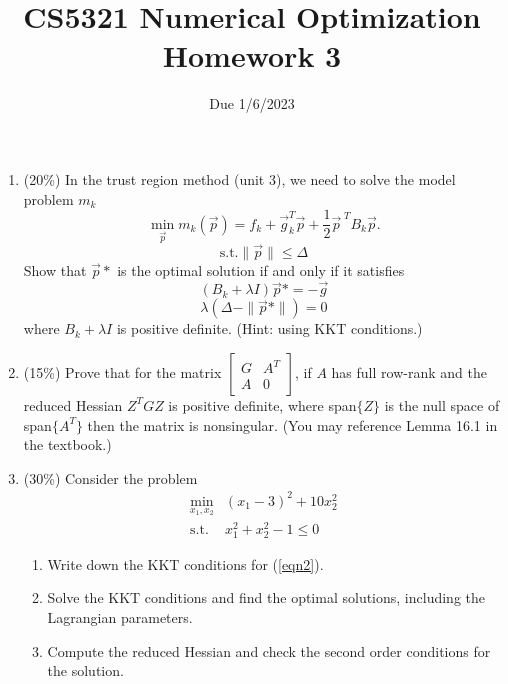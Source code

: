 \documentclass[a4paper,10pt]{article}
\title{CS5321 Numerical Optimization Homework 3}
\author{Due 1/6/2023}
\date{}
\begin{document}
\maketitle
\begin{enumerate}
\item (20\%) In the trust region method (unit 3), we need to solve the model problem $m_k$
$$\min_{\vec{p}} m_k(\vec{p})=f_k+\vec{g}_k^T\vec{p}+\frac{1}{2}\vec{p}^{\;T}B_k\vec{p}.$$
$$\mbox{s.t.} \|\vec{p}\|\le \Delta$$ 
Show that $\vec{p}*$ is the optimal solution if and only if it satisfies 
$$(B_k+\lambda I) \vec{p}* = - \vec{g} $$
$$\lambda (\Delta -\|\vec{p}*\|)=0$$
where $B_k+\lambda I$ is positive definite.  (Hint: using KKT conditions.)

 \item (15\%) Prove that for the matrix $ \left[ \begin{array}{cc}
    G & A^T \\ A & 0
    \end{array} \right]$, if $A$ has full row-rank and the reduced Hessian $ Z^TGZ $ is positive definite, where span$\lbrace Z \rbrace$ is the null space of span$\lbrace A^T \rbrace $ then the matrix is nonsingular. (You may reference Lemma 16.1 in the textbook.)


\item (30\%) Consider the problem
    \begin{equation}\label{eqn2}
        \begin{array}{cc}
          \displaystyle\min_{x_1,x_2} & (x_1-3)^2+10x_2^2 \\
          \mbox{s.t.} & x_1^2+x_2^2 -1 \le 0
        \end{array}
    \end{equation}
\begin{enumerate}
\item Write down the KKT conditions for (\ref{eqn2}).
\item Solve the KKT conditions and find the optimal solutions, including the Lagrangian parameters.
\item Compute the reduced Hessian and check the second order conditions for the solution.
\end{enumerate}



\end{enumerate}
\end{document}
